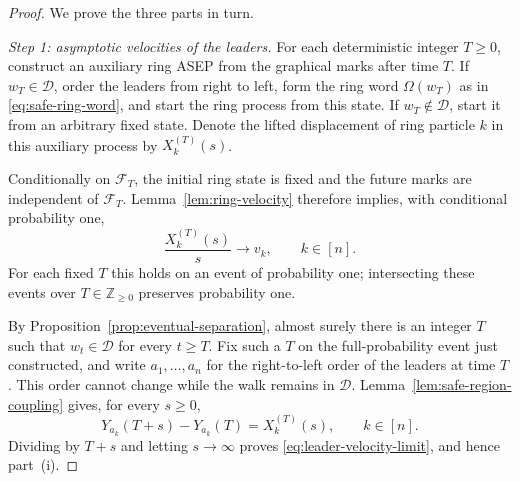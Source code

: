 \documentclass[11pt,a4paper]{amsart}
\theoremstyle{definition}
\theoremstyle{remark}
\numberwithin{equation}{section}
\newcommand{\Z}{\mathbb Z}
\newcommand{\cD}{\mathcal D}
\newcommand{\cF}{\mathcal F}
\begin{document}
	\begin{proof}
		We prove the three parts in turn.
		
		\medskip
		\noindent\emph{Step 1: asymptotic velocities of the leaders.}
		For each deterministic integer $T\ge0$, construct an auxiliary ring ASEP
		from the graphical marks after time $T$.  If $w_T\in\cD$, order the leaders
		from right to left, form the ring word $\Omega(w_T)$ as in
		\eqref{eq:safe-ring-word}, and start the ring process from this state.  If
		$w_T\notin\cD$, start it from an arbitrary fixed state.  Denote the lifted
		displacement of ring particle $k$ in this auxiliary process by
		$X_k^{(T)}(s)$.
		
		Conditionally on $\cF_T$, the initial ring state is fixed and the future
		marks are independent of $\cF_T$.  Lemma~\ref{lem:ring-velocity} therefore
		implies, with conditional probability one,
		\[
		\frac{X_k^{(T)}(s)}s\longrightarrow v_k,
		\qquad k\in[n].
		\]
		For each fixed $T$ this holds on an event of probability one; intersecting
		these events over $T\in\Z_{\ge0}$ preserves probability one.
		
		By Proposition~\ref{prop:eventual-separation}, almost surely there is an
		integer $T$ such that $w_t\in\cD$ for every $t\ge T$.  Fix such a $T$ on the
		full-probability event just constructed, and write $a_1,\ldots,a_n$ for the
		right-to-left order of the leaders at time $T$.  This order cannot change
		while the walk remains in $\cD$.  Lemma~\ref{lem:safe-region-coupling}
		gives, for every $s\ge0$,
		\begin{equation}\label{eq:theorem-safe-coupling}
			Y_{a_k}(T+s)-Y_{a_k}(T)=X_k^{(T)}(s),
			\qquad k\in[n].
		\end{equation}
		Dividing by $T+s$ and letting $s\to\infty$ proves
		\eqref{eq:leader-velocity-limit}, and hence part~(i).
		

\end{proof}
\end{document}
